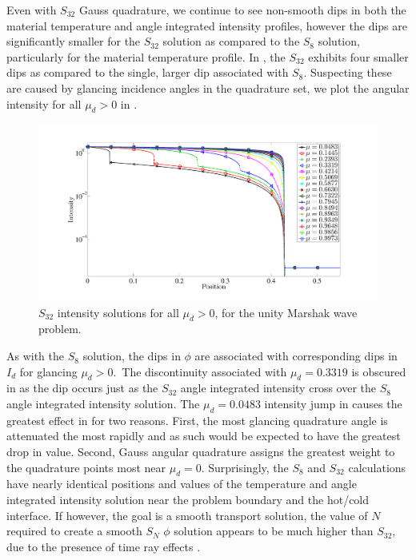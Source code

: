 Even with $S_{32}$ Gauss quadrature, we continue to see non-smooth dips in both the material temperature and angle integrated intensity profiles, however the dips are significantly smaller for the $S_{32}$ solution as compared to the $S_8$ solution, particularly for the material temperature profile.
In , the $S_{32}$ exhibits four smaller dips as compared to the single, larger dip associated with $S_8$.
Suspecting these are caused by glancing incidence angles in the quadrature set, we plot the angular intensity for all $\mu_d > 0$ in .
\begin{figure}[!htp]
\centering
\includegraphics[width=16cm,trim=1.5in  0.2in 0.5in 0.75in,clip=true]{chapter6_grey_radtran/Dissertation_Data/S32_Intensity.pdf}
\caption{$S_{32}$ intensity solutions for all $\mu_d > 0$, for the unity Marshak wave problem.}
\label{fig:s32_intensity}
\end{figure}
As with the $S_8$ solution, the dips in $\phi$ are associated with corresponding dips in $I_d$ for glancing $\mu_d>0$.\
The discontinuity associated with $\mu_d = 0.3319$ is obscured in  as the dip occurs just as the $S_{32}$ angle integrated intensity cross over the $S_8$ angle integrated intensity solution.
The $\mu_d=0.0483$ intensity jump in \fig{fig:s32_intensity} causes the greatest effect in \fig{fig:s8_vs_s32_radiation} for two reasons.  
First, the most glancing quadrature angle is attenuated the most rapidly and as such would be expected to have the greatest drop in value.
Second, Gauss angular quadrature assigns the greatest weight to the quadrature points most near $\mu_d = 0$. 
Surprisingly, the $S_8$ and $S_{32}$ calculations have nearly identical positions and values of the temperature and angle integrated intensity solution near the problem boundary and the hot/cold interface.  
If however, the goal is a smooth transport solution, the value of $N$ required to create a smooth $S_N$ $\phi$ solution appears to be much higher than $S_{32}$, due to the presence of time ray effects \cite{lewis_book}.

